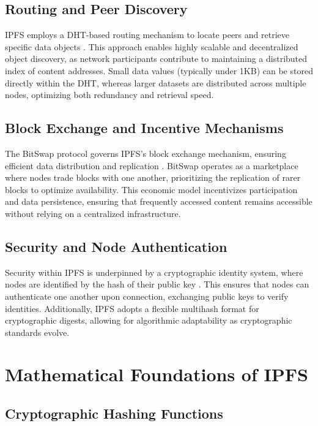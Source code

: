 \documentclass[final]{rc-book-2.14}
\begin{document}
\subsection{Routing and Peer Discovery}

IPFS employs a DHT-based routing mechanism to locate peers and retrieve specific data objects \cite{benet2014ipfs}. This approach enables highly scalable and decentralized object discovery, as network participants contribute to maintaining a distributed index of content addresses. Small data values (typically under 1KB) can be stored directly within the DHT, whereas larger datasets are distributed across multiple nodes, optimizing both redundancy and retrieval speed.

\subsection{Block Exchange and Incentive Mechanisms}

The BitSwap protocol governs IPFS’s block exchange mechanism, ensuring efficient data distribution and replication \cite{benet2014ipfs}. BitSwap operates as a marketplace where nodes trade blocks with one another, prioritizing the replication of rarer blocks to optimize availability. This economic model incentivizes participation and data persistence, ensuring that frequently accessed content remains accessible without relying on a centralized infrastructure.

\subsection{Security and Node Authentication}

Security within IPFS is underpinned by a cryptographic identity system, where nodes are identified by the hash of their public key \cite{benet2014ipfs}. This ensures that nodes can authenticate one another upon connection, exchanging public keys to verify identities. Additionally, IPFS adopts a flexible multihash format for cryptographic digests, allowing for algorithmic adaptability as cryptographic standards evolve.

\section{Mathematical Foundations of IPFS}

\subsection{Cryptographic Hashing Functions}
\end{document}

